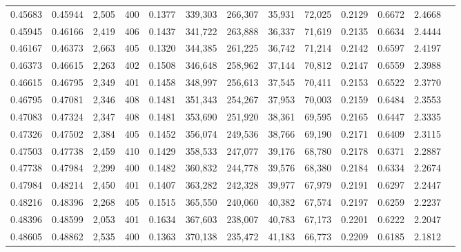 \begin{tabular}{rrrrrrrrrrrrr}
0.45683 & 0.45944 &  2,505 &   400 &                                     0.1377 & 339,303 & 266,307 &  35,931 &  72,025 & 0.2129 & 0.6672 & 2.4668 \\
0.45945 & 0.46166 &  2,419 &   406 &                                     0.1437 & 341,722 & 263,888 &  36,337 &  71,619 & 0.2135 & 0.6634 & 2.4444 \\
0.46167 & 0.46373 &  2,663 &   405 &                                     0.1320 & 344,385 & 261,225 &  36,742 &  71,214 & 0.2142 & 0.6597 & 2.4197 \\
0.46373 & 0.46615 &  2,263 &   402 &                                     0.1508 & 346,648 & 258,962 &  37,144 &  70,812 & 0.2147 & 0.6559 & 2.3988 \\
0.46615 & 0.46795 &  2,349 &   401 &                                     0.1458 & 348,997 & 256,613 &  37,545 &  70,411 & 0.2153 & 0.6522 & 2.3770 \\
0.46795 & 0.47081 &  2,346 &   408 &                                     0.1481 & 351,343 & 254,267 &  37,953 &  70,003 & 0.2159 & 0.6484 & 2.3553 \\
0.47083 & 0.47324 &  2,347 &   408 &                                     0.1481 & 353,690 & 251,920 &  38,361 &  69,595 & 0.2165 & 0.6447 & 2.3335 \\
0.47326 & 0.47502 &  2,384 &   405 &                                     0.1452 & 356,074 & 249,536 &  38,766 &  69,190 & 0.2171 & 0.6409 & 2.3115 \\
0.47503 & 0.47738 &  2,459 &   410 &                                     0.1429 & 358,533 & 247,077 &  39,176 &  68,780 & 0.2178 & 0.6371 & 2.2887 \\
0.47738 & 0.47984 &  2,299 &   400 &                                     0.1482 & 360,832 & 244,778 &  39,576 &  68,380 & 0.2184 & 0.6334 & 2.2674 \\
0.47984 & 0.48214 &  2,450 &   401 &                                     0.1407 & 363,282 & 242,328 &  39,977 &  67,979 & 0.2191 & 0.6297 & 2.2447 \\
0.48216 & 0.48396 &  2,268 &   405 &                                     0.1515 & 365,550 & 240,060 &  40,382 &  67,574 & 0.2197 & 0.6259 & 2.2237 \\
0.48396 & 0.48599 &  2,053 &   401 &                                     0.1634 & 367,603 & 238,007 &  40,783 &  67,173 & 0.2201 & 0.6222 & 2.2047 \\
0.48605 & 0.48862 &  2,535 &   400 &                                     0.1363 & 370,138 & 235,472 &  41,183 &  66,773 & 0.2209 & 0.6185 & 2.1812 \\

\end{tabular}
